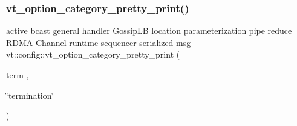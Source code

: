\subsubsection{\texorpdfstring{vt\+\_\+option\+\_\+category\+\_\+pretty\+\_\+print()}{vt\_option\_category\_pretty\_print()}\hspace{0.1cm}{\footnotesize\ttfamily [14/16]}}
{\footnotesize\ttfamily \hyperlink{namespacevt_1_1config_a6bd1d6215bda0d8ca02811798399f689a82f77c67af0c363709010c6df4dbd920}{active} bcast general \hyperlink{namespacevt_1_1config_a6bd1d6215bda0d8ca02811798399f689a82a0081a94d5c5dfd18b0b3f7eca64b7}{handler} Gossip\+LB \hyperlink{namespacevt_1_1config_a6bd1d6215bda0d8ca02811798399f689aa8d8501591ca3859c828489054b17640}{location} parameterization \hyperlink{namespacevt_1_1config_a6bd1d6215bda0d8ca02811798399f689ad2f6c4149417910966357969e4740fbd}{pipe} \hyperlink{namespacevt_1_1config_a6bd1d6215bda0d8ca02811798399f689af558c370706b5e7bd8ba5224657ca9b4}{reduce} R\+D\+MA Channel \hyperlink{namespacevt_1_1config_a6bd1d6215bda0d8ca02811798399f689afdcadb44dd13617f18aba8d42a257967}{runtime} sequencer serialized msg vt\+::config\+::vt\+\_\+option\+\_\+category\+\_\+pretty\+\_\+print (\begin{DoxyParamCaption}\item[{\hyperlink{namespacevt_1_1config_a6bd1d6215bda0d8ca02811798399f689a24e948133c50b54c4503570a8857e9b1}{term}}]{,  }\item[{\char`\"{}termination\char`\"{}}]{ }\end{DoxyParamCaption})}

\mbox{\label{namespacevt_1_1config_a5ca2c9fc237e9b84d992465ed0603537}} 

